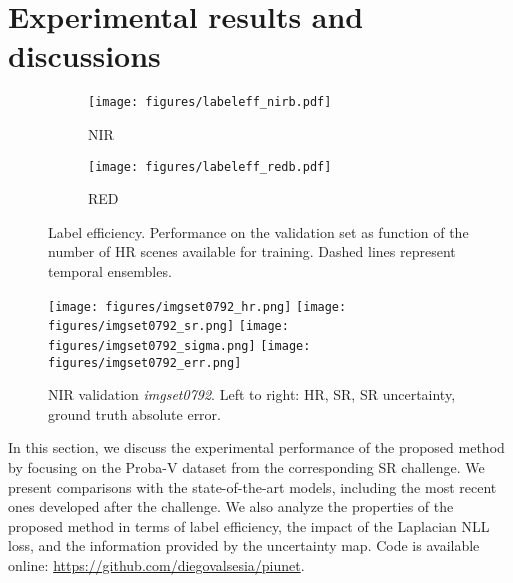 \documentclass[journal]{IEEEtran}
\begin{document}
\section{Experimental results and discussions}
\label{sec:results}



\begin{figure*}
    \centering
    \begin{subfigure}[b]{0.45\textwidth}
    \centering
    \texttt{[image: figures/labeleff\_nirb.pdf]}
    \caption{NIR}
    \end{subfigure}
    \begin{subfigure}[b]{0.45\textwidth}
    \centering
    \texttt{[image: figures/labeleff\_redb.pdf]}
    \caption{RED}
    \end{subfigure}
    \caption{Label efficiency. Performance on the validation set as function of the number of HR scenes available for training. Dashed lines represent temporal ensembles.}
    \label{fig:label_efficiency}
\end{figure*}

\begin{figure*}
    \centering
    \texttt{[image: figures/imgset0792\_hr.png]}
    \texttt{[image: figures/imgset0792\_sr.png]}
    \texttt{[image: figures/imgset0792\_sigma.png]}
    \texttt{[image: figures/imgset0792\_err.png]}
    \caption{NIR validation \textit{imgset0792}. Left to right: HR, SR, SR uncertainty, ground truth absolute error.}
    \label{fig:output_example}
\end{figure*}

In this section, we discuss the experimental performance of the proposed method by focusing on the Proba-V dataset from the corresponding SR challenge. We present comparisons with the state-of-the-art models, including the most recent ones developed after the challenge. We also analyze the properties of the proposed method in terms of label efficiency, the impact of the Laplacian NLL loss, and the information provided by the uncertainty map. Code is available online: \url{https://github.com/diegovalsesia/piunet}.
\end{document}
